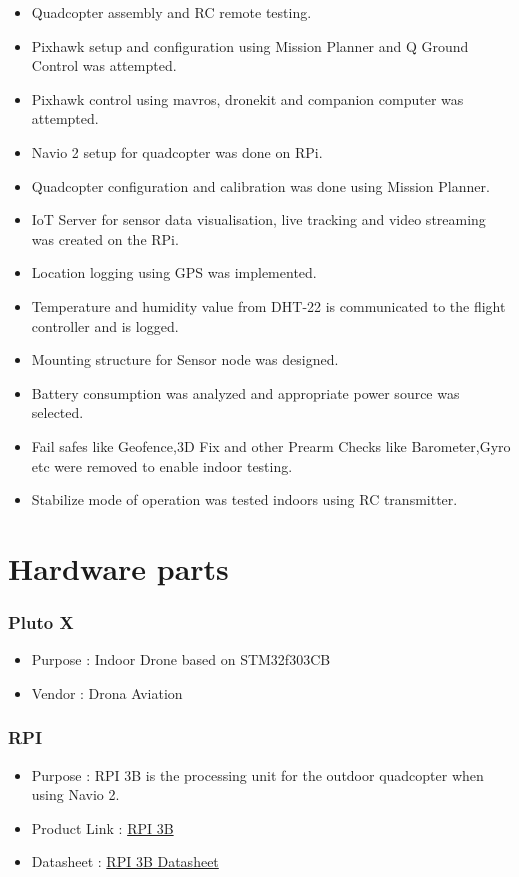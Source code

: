 \documentclass[a4paper,12pt,oneside]{book}
\begin{document}
\begin{itemize}
\item Quadcopter assembly and RC remote testing.
\item Pixhawk setup and configuration using Mission Planner and Q Ground Control was attempted.
\item Pixhawk control using mavros, dronekit and companion computer was attempted.
\item Navio 2 setup for quadcopter was done on RPi.
\item Quadcopter configuration and calibration was done using Mission Planner.
\item IoT Server for sensor data visualisation, live tracking and video streaming was created on the RPi.
\item Location logging using GPS was implemented.
\item Temperature and humidity value from DHT-22 is communicated to the flight controller and is logged.
\item Mounting structure for Sensor node was designed.
\item Battery consumption was analyzed and appropriate power source was selected.
\item Fail safes like Geofence,3D Fix and other Prearm Checks like Barometer,Gyro etc were removed to enable indoor testing.
\item Stabilize mode of operation was tested indoors using RC transmitter.
\end{itemize}

\section{Hardware parts}

\subsubsection{Pluto X } 

\begin{itemize}
  \item Purpose : Indoor Drone based on STM32f303CB
  \item Vendor  : Drona Aviation 
 \end{itemize}
 
 \subsubsection{RPI} 

\begin{itemize}
  \item Purpose : RPI 3B is the processing unit for the outdoor quadcopter when using Navio 2. 
  \item Product Link : \href{https://www.raspberrypi.org/products/raspberry-pi-3-model-b/}{RPI 3B} 
  \item Datasheet : \href{https://cdn.sparkfun.com/datasheets/Dev/RaspberryPi/2020826.pdf}{RPI 3B Datasheet} 
 \end{itemize}
 
\end{document}
